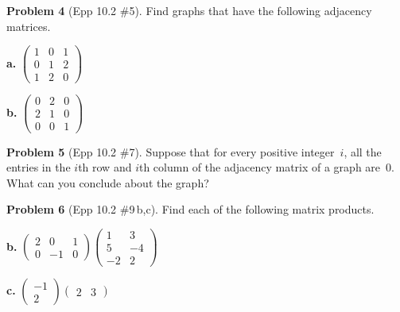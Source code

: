 \documentclass[11pt]{article}
\begin{document}
\bigskip

\noindent\textbf{Problem 4} (Epp 10.2 \#5). \;
Find graphs that have the following adjacency matrices.

\medskip

\begin{minipage}[t]{0.45\textwidth}
\centering
\textbf{a.}\quad
$\begin{pmatrix} 1 & 0 & 1 \\ 0 & 1 & 2 \\ 1 & 2 & 0 \end{pmatrix}$
\end{minipage}%
\hfill
\begin{minipage}[t]{0.45\textwidth}
\centering
\textbf{b.}\quad
$\begin{pmatrix} 0 & 2 & 0 \\ 2 & 1 & 0 \\ 0 & 0 & 1 \end{pmatrix}$
\end{minipage}

\bigskip

\noindent\textbf{Problem 5} (Epp 10.2 \#7). \;
Suppose that for every positive integer~$i$, all the entries in the
$i$th row and $i$th column of the adjacency matrix of a graph
are~0.  What can you conclude about the graph?

\bigskip

\noindent\textbf{Problem 6} (Epp 10.2 \#9\,b,c). \;
Find each of the following matrix products.

\medskip

\begin{minipage}[t]{0.45\textwidth}
\centering
\textbf{b.}\quad
$\begin{pmatrix} 2 & 0 & 1 \\ 0 & -1 & 0 \end{pmatrix}
\begin{pmatrix} 1 & 3 \\ 5 & -4 \\ -2 & 2 \end{pmatrix}$
\end{minipage}%
\hfill
\begin{minipage}[t]{0.45\textwidth}
\centering
\textbf{c.}\quad
$\begin{pmatrix} -1 \\ 2 \end{pmatrix}
\begin{pmatrix} 2 & 3 \end{pmatrix}$
\end{minipage}
\end{document}
